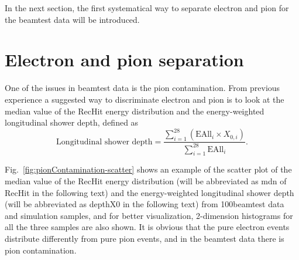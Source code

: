 In the next section, the first systematical way to separate electron and pion for the beamtest data will be introduced.

\section{Electron and pion separation}
\label{sec:Electron ID}
One of the issues in beamtest data is the pion contamination. From previous experience a suggested way to discriminate electron and pion is to look at the median value of the RecHit energy distribution and the energy-weighted longitudinal shower depth, defined as
\begin{equation}
  \text{Longitudinal shower depth} = \frac{\sum_{i=1}^{28}(\text{EAll}_{i}\times X_{0, i})}{\sum_{i=1}^{28} \text{EAll}_{i}}.
\end{equation}

Fig.~\ref{fig:pionContamination-scatter} shows an example of the scatter plot of the median value of the RecHit energy distribution (will be abbreviated as mdn of RecHit in the following text) and the energy-weighted longitudinal shower depth (will be abbreviated as depthX0 in the following text) from 100\GeV beamtest data and simulation samples, and for better visualization, 2-dimension histograms for all the three samples are also shown. It is obvious that the pure electron events distribute differently from pure pion events, and in the beamtest data there is pion contamination. 

